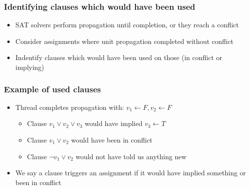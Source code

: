 \documentclass{beamer}
\begin{document}
\begin{frame}
\frametitle{Identifying clauses which would have been used}
\begin{itemize}
\item SAT solvers perform propagation until completion, or they reach a conflict
\item Consider assignments where unit propagation completed without conflict
\item Indentify clauses which would have been used on those (in conflict or implying)
\end{itemize}
\end{frame}

\begin{frame}
\frametitle{Example of used clauses}
\begin{itemize}
\item Thread completes propagation with: $v_1 \leftarrow F, v_2 \leftarrow F$
\begin{itemize}
\item Clause $v_1 \lor v_2 \lor v_3$ would have implied $ v_3 \leftarrow T$
\item Clause $v_1 \lor v_2$ would have been in conflict
\item Clause $\neg v_1 \lor v_2$ would not have told us anything new
\end{itemize}
\item We say a clause triggers an assignment if it would have implied something or been in conflict
\end{itemize}
\end{frame}

%
%
\end{document}

